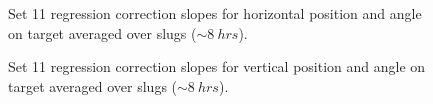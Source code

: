 \begin{figure}[ht]
\centering

\caption{Set 11 regression correction slopes for horizontal position and angle on target averaged over slugs ($\sim 8~hrs$).}
\label{fig:Set11_X_slopes}
\end{figure}
\begin{figure}[ht]
\centering
{}
\caption{Set 11 regression correction slopes for vertical position and angle on target averaged over slugs ($\sim 8~hrs$).}
\label{fig:Set11_Y_slopes}
\end{figure}
